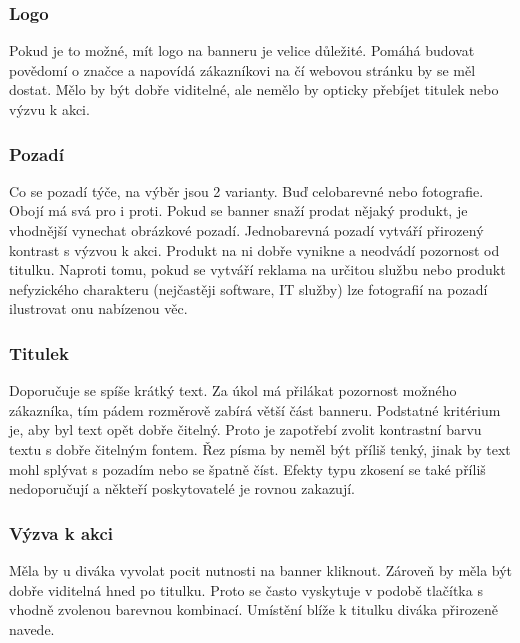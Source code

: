     \subsubsection{Logo}
    Pokud je to možné, mít logo na banneru je velice důležité. Pomáhá budovat povědomí o značce a napovídá zákazníkovi na čí webovou stránku by se měl dostat.
    Mělo by být dobře viditelné, ale nemělo by opticky přebíjet titulek nebo výzvu k akci.

    \subsubsection{Pozadí}
    Co se pozadí týče, na výběr jsou 2 varianty. Buď celobarevné nebo fotografie. Obojí má svá pro i proti. Pokud se banner snaží prodat nějaký produkt,
    je vhodnější vynechat obrázkové pozadí. Jednobarevná pozadí vytváří přirozený kontrast s výzvou k akci.
    Produkt na ni dobře vynikne a neodvádí pozornost od titulku. Naproti tomu, pokud se vytváří reklama na určitou službu nebo
    produkt nefyzického charakteru (nejčastěji software, IT služby) lze fotografií na pozadí ilustrovat onu nabízenou věc. 

    \subsubsection{Titulek}
    Doporučuje se spíše krátký text. Za úkol má přilákat pozornost možného zákazníka, tím pádem rozměrově zabírá větší část banneru.
    Podstatné kritérium je, aby byl text opět dobře čitelný. Proto je zapotřebí zvolit kontrastní barvu textu s dobře čitelným fontem.
    Řez písma by neměl být příliš tenký, jinak by text mohl splývat s pozadím nebo se špatně číst. Efekty typu zkosení se také příliš nedoporučují a
    někteří poskytovatelé je rovnou zakazují. 

    \subsubsection{Výzva k akci}
    Měla by u diváka vyvolat pocit nutnosti na banner kliknout. Zároveň by měla být dobře viditelná hned po titulku.
    Proto se často vyskytuje v podobě tlačítka s vhodně zvolenou barevnou kombinací.
    Umístění blíže k titulku diváka přirozeně navede.


\endinput